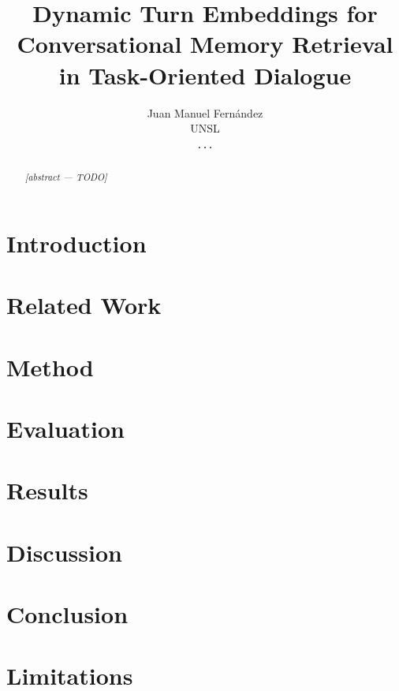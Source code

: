\documentclass[11pt]{article}
\title{Dynamic Turn Embeddings for Conversational Memory Retrieval in Task-Oriented Dialogue}
\author{Juan Manuel Fern\'andez \\ UNSL \\ \texttt{...}}
\begin{document}
\maketitle

\begin{abstract}
\textit{[abstract — TODO]}
\end{abstract}

\section{Introduction}

\section{Related Work}

\section{Method}

\section{Evaluation}

\section{Results}

\section{Discussion}

\section{Conclusion}

\section*{Limitations}

\end{document}

